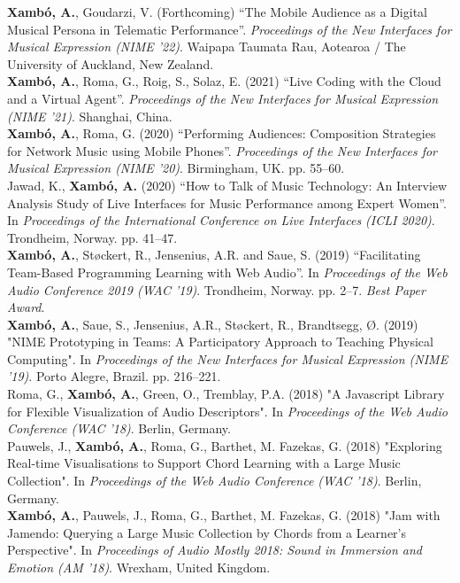 \documentclass[10pt, a4paper]{article}
\newcommand{\years}[1]{\marginnote{\scriptsize #1}}
\begin{document}
{{{\years{2022}\textbf{Xambó, A.}, Goudarzi, V. (Forthcoming) ``The Mobile Audience as a Digital Musical Persona in Telematic Performance''. \emph{Proceedings of the New Interfaces for Musical Expression (NIME '22)}. Waipapa Taumata Rau, Aotearoa / The University of Auckland, New Zealand.}\\
{\years{2021}\textbf{Xambó, A.}, Roma, G., Roig, S., Solaz, E. (2021) ``Live Coding with the Cloud and a Virtual Agent''. \emph{Proceedings of the New Interfaces for Musical Expression (NIME '21)}. Shanghai, China.}\\
{\years{2020b}\textbf{Xambó, A.}, Roma, G. (2020) ``Performing Audiences: Composition Strategies for Network Music using Mobile Phones''. \emph{Proceedings of the New Interfaces for Musical Expression (NIME '20)}. Birmingham, UK. pp. 55--60.}\\
\years{2020a}Jawad, K., \textbf{Xambó, A.} (2020) ``How to Talk of Music Technology: An Interview Analysis Study of Live Interfaces for Music Performance among Expert Women''. In \emph{Proceedings of the International Conference on Live Interfaces (ICLI 2020)}. Trondheim, Norway. pp. 41--47.\\
\years{2019b}\textbf{Xambó, A.}, Støckert, R., Jensenius, A.R. and Saue, S. (2019) ``Facilitating Team-Based Programming Learning with Web Audio''. In \emph{Proceedings of the Web Audio Conference 2019 (WAC '19)}. Trondheim, Norway. pp. 2--7. \emph{Best Paper Award}.\\
\years{2019a}\textbf{Xambó, A.}, Saue, S., Jensenius, A.R., Støckert, R., Brandtsegg, Ø. (2019) "NIME Prototyping in Teams: A Participatory Approach to Teaching Physical Computing". In \emph{Proceedings of the New Interfaces for Musical Expression (NIME ’19)}. Porto Alegre, Brazil. pp. 216–221.\\
\years{2018f}Roma, G., \textbf{Xambó, A.}, Green, O., Tremblay, P.A. (2018) "A Javascript Library for Flexible Visualization of Audio Descriptors". In \emph{Proceedings of the Web Audio Conference (WAC '18)}. Berlin, Germany.\\
\years{2018e}Pauwels, J., \textbf{Xambó, A.}, Roma, G., Barthet, M. Fazekas, G. (2018) "Exploring Real-time Visualisations to Support Chord Learning with a Large Music Collection". In \emph{Proceedings of the Web Audio Conference (WAC '18)}. Berlin, Germany.\\
\years{2018d}\textbf{Xambó, A.}, Pauwels, J., Roma, G., Barthet, M. Fazekas, G. (2018) "Jam with Jamendo: Querying a Large Music Collection by Chords from a Learner’s Perspective". In \emph{Proceedings of Audio Mostly 2018: Sound in Immersion and Emotion (AM '18)}. Wrexham, United Kingdom. \\
}}
\end{document}

